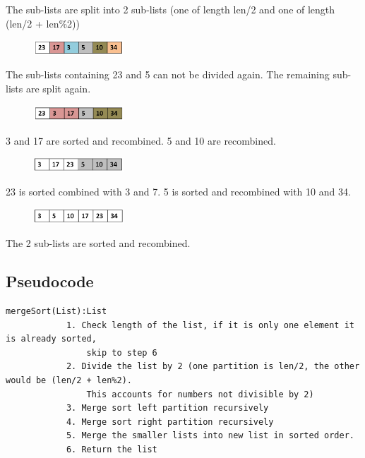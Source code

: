 The sub-lists are split into 2 sub-lists (one of length len/2 and one of length (len/2 + len\%2))

\begin{figure}[H]
\centering
\includegraphics[width=0.3\textwidth]{pictures/merge4.png}
\label{fig:merge4}
\end{figure}

The sub-lists containing 23 and 5 can not be divided again. The remaining sub-lists are split again.

\begin{figure}[H]
\centering
\includegraphics[width=0.3\textwidth]{pictures/merge5.png}
\label{fig:merge5}
\end{figure}

3 and 17 are sorted and recombined. 5 and 10 are recombined.

\begin{figure}[H]
\centering
\includegraphics[width=0.3\textwidth]{pictures/merge6.png}
\label{fig:merge6}
\end{figure}

23 is sorted combined with 3 and 7. 5 is sorted and recombined with 10 and 34.

\begin{figure}[H]
\centering
\includegraphics[width=0.3\textwidth]{pictures/merge7.png}
\label{fig:merge7}
\end{figure}

The 2 sub-lists are sorted and recombined. 

\subsection{Pseudocode}

\begin{verbatim}
mergeSort(List):List
            1. Check length of the list, if it is only one element it is already sorted, 
                skip to step 6
            2. Divide the list by 2 (one partition is len/2, the other would be (len/2 + len%2). 
                This accounts for numbers not divisible by 2) 
            3. Merge sort left partition recursively
            4. Merge sort right partition recursively
            5. Merge the smaller lists into new list in sorted order.
            6. Return the list
\end{verbatim}

